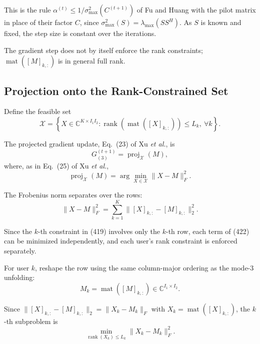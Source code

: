 \documentclass[12pt,a4paper]{article}
\begin{document}
This is the rule $\alpha^{(t)}\leq 1/\sigma_{\max}^2(C^{(t+1)})$ of Fu and
Huang with the pilot matrix in place of their factor $C$, since
$\sigma_{\max}^2(S)=\lambda_{\max}(SS^H)$. As $S$ is known and fixed, the step
size is constant over the iterations.

The gradient step does not by itself enforce the rank constraints;
$\operatorname{mat}([M]_{k,:})$ is in general full rank.

\subsection{Projection onto the Rank-Constrained Set}

Define the feasible set
\begin{equation}
\boxed{
\mathcal X
=
\left\{
X\in\mathbb C^{K\times I_1I_2}:
\operatorname{rank}\!\left(
\operatorname{mat}([X]_{k,:})
\right)\leq L_k,
\ \forall k
\right\}.
}
\tag{419}
\end{equation}

The projected gradient update, Eq.~(23) of Xu \emph{et al.}, is
\begin{equation}
\boxed{
G_{(3)}^{(t+1)}
=
\operatorname{proj}_{\mathcal X}(M),
}
\tag{420}
\end{equation}
where, as in Eq.~(25) of Xu \emph{et al.},
\begin{equation}
\boxed{
\operatorname{proj}_{\mathcal X}(M)
=
\arg\min_{X\in\mathcal X}
\|X-M\|_F^2.
}
\tag{421}
\end{equation}

The Frobenius norm separates over the rows:
\begin{equation}
\|X-M\|_F^2
=
\sum_{k=1}^{K}
\|[X]_{k,:}-[M]_{k,:}\|_2^2.
\tag{422}
\end{equation}

Since the $k$-th constraint in (419) involves only the $k$-th row,
each term of (422) can be minimized independently, and each user's rank
constraint is enforced separately.

For user $k$, reshape the row using the same column-major ordering as
the mode-3 unfolding:
\begin{equation}
\boxed{
M_k
=
\operatorname{mat}([M]_{k,:})
\in\mathbb C^{I_1\times I_2}.
}
\tag{423}
\end{equation}

Since $\|[X]_{k,:}-[M]_{k,:}\|_2=\|X_k-M_k\|_F$ with
$X_k=\operatorname{mat}([X]_{k,:})$, the $k$-th subproblem is
\begin{equation}
\min_{\operatorname{rank}(X_k)\leq L_k}
\|X_k-M_k\|_F^2 .
\tag{423a}
\end{equation}
\end{document}
